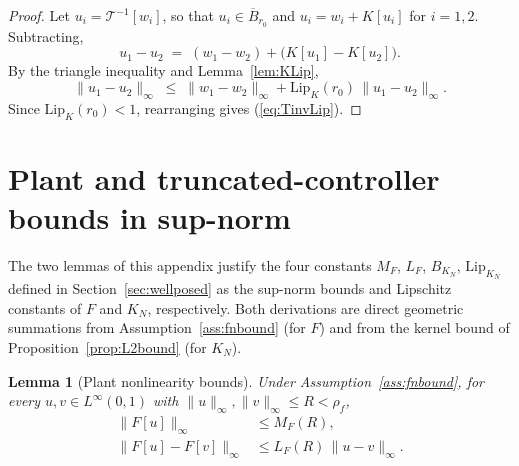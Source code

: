 \documentclass[10pt,a4paper]{amsart}
\newtheorem{lemma}{Lemma}
\newcommand{\Tcal}{\mathcal{T}}
\newcommand{\Linf}{L^\infty}
\newcommand{\Lipk}{\mathrm{Lip}_K}
\newcommand{\LipKn}{\mathrm{Lip}_{K_N}}
\newcommand{\Bball}{\overline{B}}
\begin{document}
\begin{proof}
Let $u_i = \Tcal^{-1}[w_i]$, so that $u_i \in \Bball_{r_0}$ and $u_i = w_i + K[u_i]$ for $i = 1, 2$. Subtracting,
\begin{equation}
u_1 - u_2 \;=\; (w_1 - w_2) + \bigl(K[u_1] - K[u_2]\bigr).
\label{eq:u1u2_diff}
\end{equation}
By the triangle inequality and Lemma~\ref{lem:KLip},
\begin{equation}
\|u_1 - u_2\|_\infty \;\le\; \|w_1 - w_2\|_\infty + \Lipk(r_0)\,\|u_1 - u_2\|_\infty.
\label{eq:u1u2_bound}
\end{equation}
Since $\Lipk(r_0) < 1$, rearranging gives (\ref{eq:TinvLip}).
\end{proof}

\section{Plant and truncated-controller bounds in sup-norm}\label{app:Fbounds}

The two lemmas of this appendix justify the four constants $M_F$, $L_F$, $B_{K_N}$, $\LipKn$ defined in Section~\ref{sec:wellposed} as the sup-norm bounds and Lipschitz constants of $F$ and $K_N$, respectively. Both derivations are direct geometric summations from Assumption~\ref{ass:fnbound} (for $F$) and from the kernel bound of Proposition~\ref{prop:L2bound} (for $K_N$).

\begin{lemma}[Plant nonlinearity bounds]\label{lem:Fbounds}
Under Assumption~\ref{ass:fnbound}, for every $u, v \in \Linf(0,1)$ with $\|u\|_\infty, \|v\|_\infty \le R < \rho_f$,
\begin{align}
\|F[u]\|_\infty &\le M_F(R), \label{eq:Fbound}\\
\|F[u] - F[v]\|_\infty &\le L_F(R)\,\|u - v\|_\infty. \label{eq:Flip}
\end{align}
\end{lemma}
\end{document}
